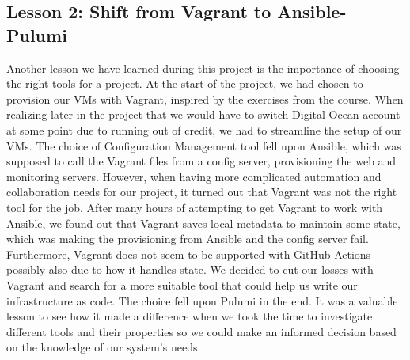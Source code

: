 \subsection{Lesson 2: Shift from Vagrant to Ansible-Pulumi}
Another lesson we have learned during this project is the importance of choosing the right tools for a project.
At the start of the project, we had chosen to provision our VMs with Vagrant, inspired by the exercises from the course.
When realizing later in the project that we would have to switch Digital Ocean account at some point due to running out of credit, we had to streamline the setup of our VMs.
The choice of Configuration Management tool fell upon Ansible, which was supposed to call the Vagrant files from a config server, provisioning the web and monitoring servers.
However, when having more complicated automation and collaboration needs for our project, it turned out that Vagrant was not the right tool for the job.
After many hours of attempting to get Vagrant to work with Ansible, we found out that Vagrant saves local metadata to maintain some state, which was making the provisioning from Ansible and the config server fail\cite{issue178-vagrant-ansible}. Furthermore, Vagrant does not seem to be supported with GitHub Actions - possibly also due to how it handles state.
We decided to cut our losses with Vagrant and search for a more suitable tool that could help us write our infrastructure as code.
The choice fell upon Pulumi in the end.
It was a valuable lesson to see how it made a difference when we took the time to investigate different tools and their properties so we could make an informed decision based on the knowledge of our system's needs.


